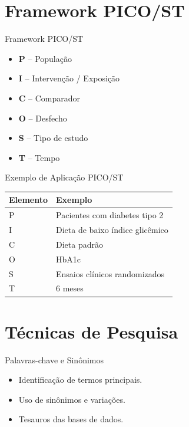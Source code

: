\documentclass[aspectratio=169]{beamer}
\begin{document}
\section{Framework PICO/ST}

\begin{frame}{Framework PICO/ST}
\begin{itemize}
    \item \textbf{P} – População
    \item \textbf{I} – Intervenção / Exposição
    \item \textbf{C} – Comparador
    \item \textbf{O} – Desfecho
    \item \textbf{S} – Tipo de estudo
    \item \textbf{T} – Tempo
\end{itemize}
\end{frame}

\begin{frame}{Exemplo de Aplicação PICO/ST}
\begin{table}
\centering
\begin{tabular}{p{2cm} p{7cm}}
\toprule
Elemento & Exemplo \\
\midrule
P & Pacientes com diabetes tipo 2 \\
I & Dieta de baixo índice glicêmico \\
C & Dieta padrão \\
O & HbA1c \\
S & Ensaios clínicos randomizados \\
T & 6 meses \\
\bottomrule
\end{tabular}
\end{table}
\end{frame}

\section{Técnicas de Pesquisa}

\begin{frame}{Palavras-chave e Sinônimos}
\begin{itemize}
    \item Identificação de termos principais.
    \item Uso de sinônimos e variações.
    \item Tesauros das bases de dados.
\end{itemize}
\end{frame}
\end{document}
